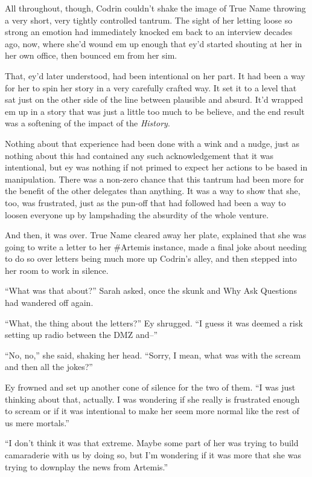 All throughout, though, Codrin couldn't shake the image of True Name throwing a very short, very tightly controlled tantrum. The sight of her letting loose so strong an emotion had immediately knocked em back to an interview decades ago, now, where she'd wound em up enough that ey'd started shouting at her in her own office, then bounced em from her sim.

That, ey'd later understood, had been intentional on her part. It had been a way for her to spin her story in a very carefully crafted way. It set it to a level that sat just on the other side of the line between plausible and absurd. It'd wrapped em up in a story that was just a little too much to be believe, and the end result was a softening of the impact of the \emph{History}.

Nothing about that experience had been done with a wink and a nudge, just as nothing about this had contained any such acknowledgement that it was intentional, but ey was nothing if not primed to expect her actions to be based in manipulation. There was a non-zero chance that this tantrum had been more for the benefit of the other delegates than anything. It was a way to show that she, too, was frustrated, just as the pun-off that had followed had been a way to loosen everyone up by lampshading the absurdity of the whole venture.

And then, it was over. True Name cleared away her plate, explained that she was going to write a letter to her \#Artemis instance, made a final joke about needing to do so over letters being much more up Codrin's alley, and then stepped into her room to work in silence.

``What was that about?'' Sarah asked, once the skunk and Why Ask Questions had wandered off again.

``What, the thing about the letters?'' Ey shrugged. ``I guess it was deemed a risk setting up radio between the DMZ and--''

``No, no,'' she said, shaking her head. ``Sorry, I mean, what was with the scream and then all the jokes?''

Ey frowned and set up another cone of silence for the two of them. ``I was just thinking about that, actually. I was wondering if she really is frustrated enough to scream or if it was intentional to make her seem more normal like the rest of us mere mortals.''

``I don't think it was that extreme. Maybe some part of her was trying to build camaraderie with us by doing so, but I'm wondering if it was more that she was trying to downplay the news from Artemis.''

